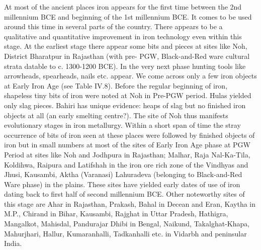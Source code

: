 At most of the ancient places iron appears for the first time between the 2nd millennium BCE and beginning of the 1st millennium BCE. It comes to be used around this time in several parts of the country. There appears to be a qualitative and quantitative improvement in iron technology even within this stage. At the earliest stage there appear some bits and pieces at sites like Noh, District Bharatpur in Rajasthan (with pre- PGW, Black-and-Red ware cultural strata datable to c. 1300-1200 BCE). In the very next phase hunting tools like arrowheads, spearheads, nails etc. appear. We come across only a few iron objects at Early Iron Age (see Table IV.8). Before the regular beginning of iron, shapeless tiny bits of iron were noted at Noh in Pre-PGW period. Hulas yielded only slag pieces. Bahiri has unique evidence: heaps of slag but no finished iron objects at all (an early smelting centre?). The site of Noh thus manifests evolutionary stages in iron metallurgy. Within a short span of time the stray occurrence of bits of iron seen at these places were followed by finished objects of iron but in small numbers at most of the sites of Early Iron Age phase at PGW Period at sites like Noh and Jodhpura in Rajasthan; Malhar, Raja Nal-Ka-Tila, Koldihwa, Raipura and Latifshah in the iron ore rich zone of the Vindhyas and Jhusi, Kausambi, Aktha (Varanasi) Lahuradeva (belonging to Black-and-Red Ware phase) in the plains. These sites have yielded early dates of use of iron dating back to first half of second millennium BCE. Other noteworthy sites of this stage are Ahar in Rajasthan, Prakash, Bahal in Decean and Eran, Kaytha in M.P., Chirand in Bihar, Kausambi, Rajghat in Uttar Pradesh, Hathigra, Mangalkot, Mahisdal, Pandurajar Dhibi in Bengal, Naikund, Takalghat-Khapa, Mahurjhari, Hallur, Kumaranhalli, Tadkanhalli etc. in Vidarbh and peninsular India.

